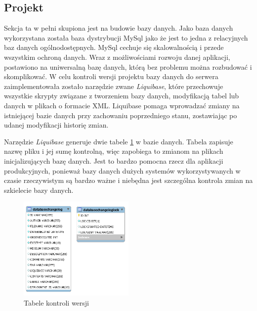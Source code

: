 \subsection{Projekt}
Sekcja ta w pełni skupiona jest na budowie bazy danych. Jako baza danych wykorzystana została baza dystrybucji MySql jako że jest to jedna z relacyjnych baz danych ogólnodostępnych. MySql cechuje się skalowalnością i przede wszystkim ochroną danych. Wraz z możliwościami rozwoju danej aplikacji, postawiono na uniwersalną bazę danych, którą bez problemu można rozbudować i skomplikować.
W celu kontroli wersji projektu bazy danych do serwera zaimplementowała zostało narzędzie zwane \textit{Liquibase}, które przechowuje wszystkie skrypty związane z tworzeniem bazy danych, modyfikacją tabel lub danych w plikach o formacie XML. Liquibase pomaga wprowadzać zmiany na istniejącej bazie danych przy zachowaniu poprzedniego stanu, zostawiając po udanej modyfikacji historię zmian. 


Narzędzie \textit{Liquibase} generuje dwie tabele \ref{liqutable} w bazie danych. Tabela zapisuje nazwę pliku i jej sumę kontrolną, więc zapobiega to zmianom na plikach inicjalizujących bazę danych.
Jest to bardzo pomocna rzecz dla aplikacji produkcyjnych, ponieważ bazy danych dużych systemów wykorzystywanych w czasie rzeczywistym są bardzo ważne i niebędna jest szczególna kontrola zmian na szkielecie bazy danych.
\clearpage
\begin{figure}[h]
	\centering
	\includegraphics[width=0.50\textwidth]{liquibasetables}
	\caption{ Tabele kontroli wersji}
	\label{liqutable}
\end{figure}

